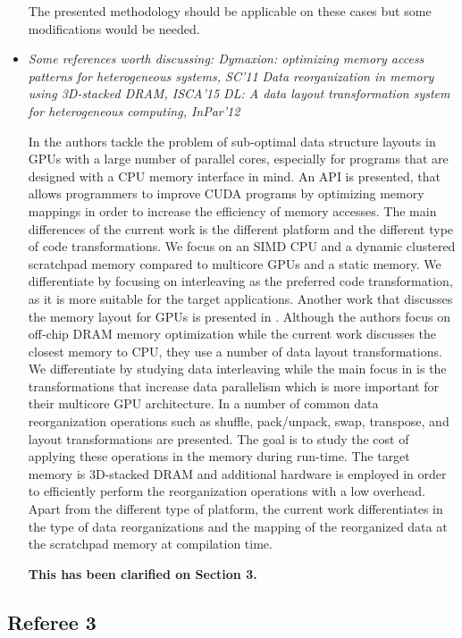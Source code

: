 \documentclass[12pt,a4paper,notitlepage]{article}
\begin{document}
\begin{itemize}
The presented methodology should be applicable on these cases but some modifications would be needed.

\item \textit{Some references worth discussing:
Dymaxion: optimizing memory access patterns for heterogeneous systems, SC'11
Data reorganization in memory using 3D-stacked DRAM, ISCA'15
DL: A data layout transformation system for heterogeneous computing, InPar'12}

In \cite{dymaxion} the authors tackle the problem of sub-optimal data structure layouts in GPUs with a large number of parallel cores, especially for programs that are designed with a CPU memory interface in mind. 
An API is presented, that allows programmers to improve CUDA programs by optimizing memory mappings in order to increase the efficiency of memory accesses. 
The main differences of the current work is the different platform and the different type of code transformations. 
We focus on an SIMD CPU and a dynamic clustered scratchpad memory compared to multicore GPUs and a static memory. 
We differentiate by focusing on interleaving as the preferred code transformation, as it is more suitable for the target applications.
Another work that discusses the memory layout for GPUs is presented in \cite{DL}.
Although the authors focus on off-chip DRAM memory optimization while the current work discusses the closest memory to CPU, they use a number of data layout transformations.
We differentiate by studying data interleaving while the main focus in \cite{DL} is the transformations that increase data parallelism which is more important for their multicore GPU architecture.
In \cite{3D} a number of common data reorganization operations such as shuffle, pack/unpack, swap, transpose, and layout transformations are presented. 
The goal is to study the cost of applying these operations in the memory during run-time. The target memory is 3D-stacked DRAM and additional hardware is employed in order to efficiently perform the reorganization operations with a low overhead. 
Apart from the different type of platform, the current work differentiates in the type of data reorganizations and the mapping of the reorganized data at the scratchpad memory at compilation time. 

\textbf{This has been clarified on Section 3.}

\end{itemize}

\subsection*{Referee 3}
\end{document}
